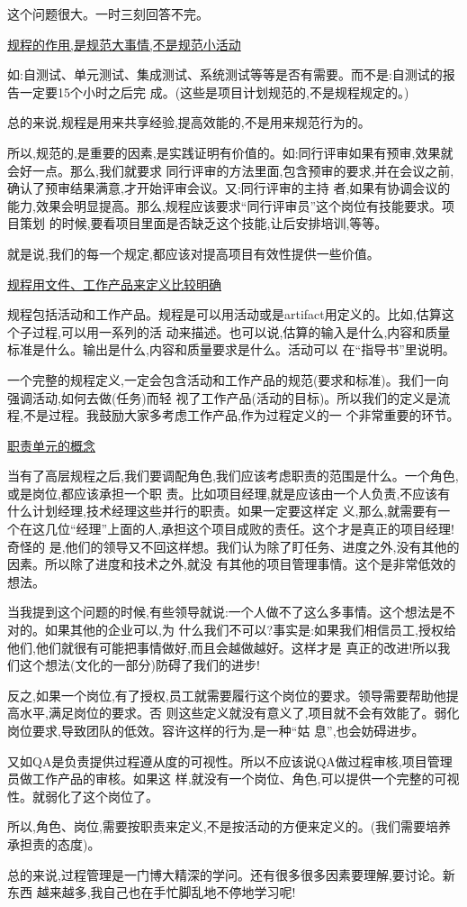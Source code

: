 \documentclass[11pt]{article}
\begin{document}
\begin{yang}
\ylogo 这个问题很大。一时三刻回答不完。

\underline{规程的作用,是规范大事情,不是规范小活动}

  如:自测试、单元测试、集成测试、系统测试等等是否有需要。而不是:自测试的报告一定要15个小时之后完
  成。(这些是项目计划规范的,不是规程规定的。)

  总的来说,规程是用来共享经验,提高效能的,不是用来规范行为的。

  所以,规范的,是重要的因素,是实践证明有价值的。如:同行评审如果有预审,效果就会好一点。那么,我们就要求
  同行评审的方法里面,包含预审的要求,并在会议之前,确认了预审结果满意,才开始评审会议。又:同行评审的主持
  者,如果有协调会议的能力,效果会明显提高。那么,规程应该要求``同行评审员''这个岗位有技能要求。项目策划
  的时候,要看项目里面是否缺乏这个技能,让后安排培训,等等。

  就是说,我们的每一个规定,都应该对提高项目有效性提供一些价值。

\underline{规程用文件、工作产品来定义比较明确}

  规程包括活动和工作产品。规程是可以用活动或是artifact用定义的。比如,估算这个子过程,可以用一系列的活
  动来描述。也可以说,估算的输入是什么,内容和质量标准是什么。输出是什么,内容和质量要求是什么。活动可以
  在``指导书''里说明。

  一个完整的规程定义,一定会包含活动和工作产品的规范(要求和标准)。我们一向强调活动,如何去做(任务)而轻
  视了工作产品(活动的目标)。所以我们的定义是流程,不是过程。我鼓励大家多考虑工作产品,作为过程定义的一
  个非常重要的环节。

\underline{职责单元的概念}

  当有了高层规程之后,我们要调配角色,我们应该考虑职责的范围是什么。一个角色,或是岗位,都应该承担一个职
  责。比如项目经理,就是应该由一个人负责,不应该有什么计划经理,技术经理这些并行的职责。如果一定要这样定
  义,那么,就需要有一个在这几位``经理''上面的人,承担这个项目成败的责任。这个才是真正的项目经理!奇怪的
  是,他们的领导又不回这样想。我们认为除了盯任务、进度之外,没有其他的因素。所以除了进度和技术之外,就没
  有其他的项目管理事情。这个是非常低效的想法。

  当我提到这个问题的时候,有些领导就说:一个人做不了这么多事情。这个想法是不对的。如果其他的企业可以,为
  什么我们不可以?事实是:如果我们相信员工,授权给他们,他们就很有可能把事情做好,而且会越做越好。这样才是
  真正的改进!所以我们这个想法(文化的一部分)防碍了我们的进步!

  反之,如果一个岗位,有了授权,员工就需要履行这个岗位的要求。领导需要帮助他提高水平,满足岗位的要求。否
  则这些定义就没有意义了,项目就不会有效能了。弱化岗位要求,导致团队的低效。容许这样的行为,是一种``姑
  息'',也会妨碍进步。

  又如QA是负责提供过程遵从度的可视性。所以不应该说QA做过程审核,项目管理员做工作产品的审核。如果这
  样,就没有一个岗位、角色,可以提供一个完整的可视性。就弱化了这个岗位了。

  所以,角色、岗位,需要按职责来定义,不是按活动的方便来定义的。(我们需要培养承担责的态度)。

   总的来说,过程管理是一门博大精深的学问。还有很多很多因素要理解,要讨论。新东西
   越来越多,我自己也在手忙脚乱地不停地学习呢!
\end{yang}
\end{document}
